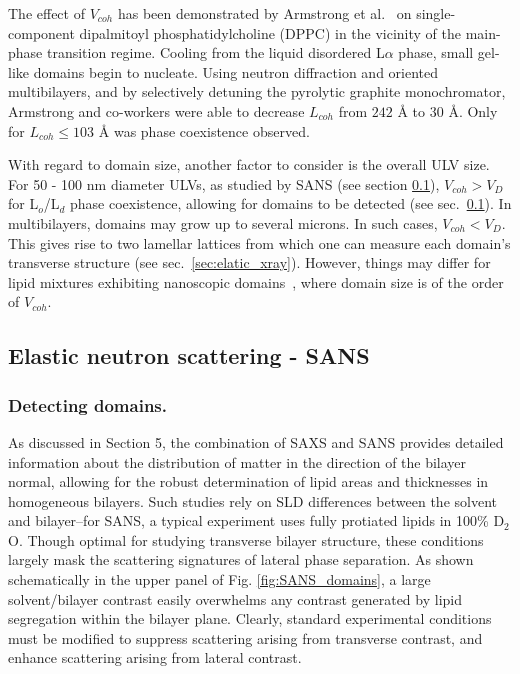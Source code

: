 \documentclass[8.5pt,twoside,twocolumn]{article}
\begin{document}
The effect of $V_{coh}$ has been demonstrated by Armstrong et al.~\citealp{Armstrong.2012b} on single-component dipalmitoyl phosphatidylcholine (DPPC) in the vicinity of the main-phase transition regime. Cooling from the liquid disordered L${\alpha}$ phase, small gel-like domains begin to nucleate. Using neutron diffraction and oriented multibilayers, and by selectively detuning the pyrolytic graphite monochromator, Armstrong and co-workers were able to  decrease $L_{coh}$ from  $242$ \AA\/ to $30$ \AA. Only for $L_{coh} \le 103$ \AA\/ was phase coexistence observed.

With regard to domain size, another factor to consider is the overall ULV size. For 50 - 100 nm diameter ULVs, as studied by SANS (see section \ref{SANS_domains}), $V_{coh} > V_D$ for L$_o$/L$_d$ phase coexistence, allowing for domains to be detected (see sec.~\ref{SANS_domains}). In multibilayers, domains may grow up to several microns. In such cases, $V_{coh} < V_D$. This gives rise to two lamellar lattices from which one can measure each domain's transverse structure (see sec.~\ref{sec:elatic_xray}). However, things may differ for lipid mixtures exhibiting nanoscopic domains~\cite{Heberle.2013}, where domain size is of the order of $V_{coh}$. 

\subsection{Elastic neutron scattering - SANS}
\label{SANS_domains}
\subsubsection{Detecting domains. }
As discussed in Section 5, the combination of SAXS and SANS provides detailed  information about the distribution of matter in the direction of the bilayer normal, allowing for the robust determination of lipid areas and thicknesses in homogeneous bilayers. Such studies rely on SLD differences between the solvent and bilayer--for SANS, a typical experiment uses fully protiated lipids in 100\% D$_2$O. Though optimal for studying transverse bilayer structure, these conditions largely mask the scattering signatures of lateral phase separation. As shown schematically in the upper panel of Fig. \ref{fig:SANS_domains}, a large solvent/bilayer contrast easily overwhelms any contrast generated by lipid segregation within the bilayer plane. Clearly, standard experimental conditions must be modified to suppress scattering arising from transverse contrast, and enhance scattering arising from lateral contrast.
\end{document}
